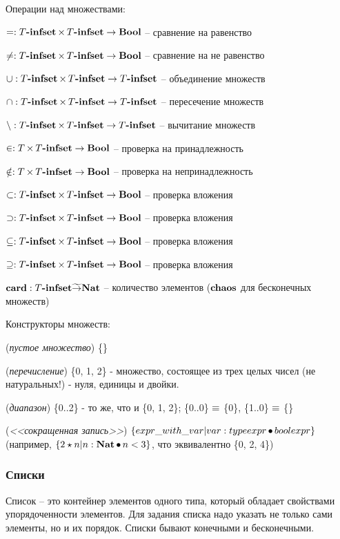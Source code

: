 \documentclass[14pt, twoside]{extreport}
\newcommand{\head}[1]{\vspace{1cm}\subsubsection*{#1}}
\begin{document}
Операции над множествами:
\begin{list}{}{}
\item $= : T\textbf{-infset} \mathop{\times} T\textbf{-infset} \rightarrow \textbf{Bool}$ -- сравнение на равенство
\item $\neq : T\textbf{-infset} \mathop{\times} T\textbf{-infset} \rightarrow \textbf{Bool}$ -- сравнение на не равенство
\item $\mathop{\cup}: T\textbf{-infset} \mathop{\times} T\textbf{-infset} \rightarrow T\textbf{-infset}$ -- объединение множеств
\item $\mathop{\cap}: T\textbf{-infset} \mathop{\times} T\textbf{-infset} \rightarrow T\textbf{-infset}$ -- пересечение множеств
\item $\mathop{\setminus}: T\textbf{-infset} \mathop{\times} T\textbf{-infset} \rightarrow T\textbf{-infset}$ -- вычитание множеств
\item $\in: T \mathop{\times} T\textbf{-infset} \rightarrow \textbf{Bool}$ -- проверка на принадлежность
\item $\notin: T \mathop{\times} T\textbf{-infset} \rightarrow \textbf{Bool}$ -- проверка на непринадлежность
\item $\subset: T\textbf{-infset} \mathop{\times} T\textbf{-infset} \rightarrow \textbf{Bool}$ -- проверка вложения
\item $\supset: T\textbf{-infset} \mathop{\times} T\textbf{-infset} \rightarrow \textbf{Bool}$ -- проверка вложения
\item $\subseteq: T\textbf{-infset} \mathop{\times} T\textbf{-infset} \rightarrow \textbf{Bool}$ -- проверка вложения
\item $\supseteq: T\textbf{-infset} \mathop{\times} T\textbf{-infset} \rightarrow \textbf{Bool}$ -- проверка вложения
\item $\mathop{\textbf{card}}: T\textbf{-infset} \widetilde{\rightarrow} \textbf{Nat}$ -- количество элементов
($\textbf{chaos}$ для бесконечных множеств)
\end{list}


Конструкторы множеств:
\begin{list}{}{}
\item (\emph{пустое множество}) \{\}
\item (\emph{перечисление}) \{0, 1, 2\} - множество, состоящее из трех целых чисел (не
натуральных!) - нуля, единицы и двойки.
\item (\emph{диапазон}) \{0..2\} -  то же, что и \{0, 1, 2\};
\{0..0\} $\mathop{\equiv}$ \{0\}, \{1..0\} $\mathop{\equiv}$ \{\}
\item (\emph{<<сокращенная запись>>}) $\{ expr\_with\_var | var : typeexpr
\mathop{\bullet} boolexpr\}$ (например, $\{2 \star n | n : \textbf{Nat} \mathop{\bullet} n < 3
\}$, что эквивалентно \{0, 2, 4\})
\end{list}

\head{Списки}
Список -- это контейнер элементов одного типа, который обладает свойствами упорядоченности элементов. Для задания списка надо указать не только сами элементы, но и их порядок. Списки бывают конечными и бесконечными.
\end{document}
